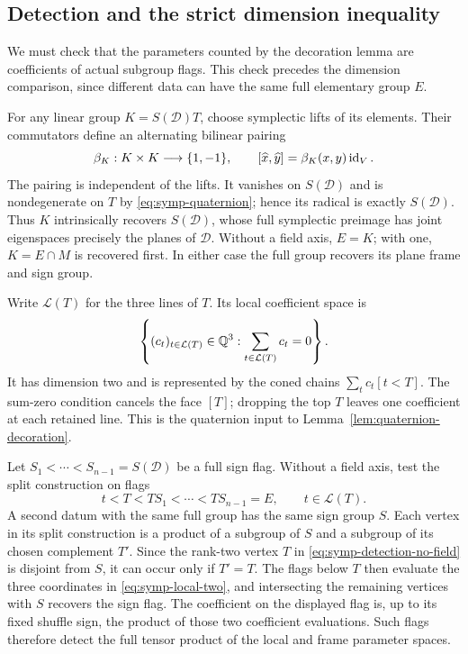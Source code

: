 \subsection{Detection and the strict dimension inequality}

We must check that the parameters counted by the decoration lemma
are coefficients of actual subgroup flags.  This check precedes
the dimension comparison, since different data can have the same
full elementary group $E$.

For any linear group $K=S(\mathcal D)T$, choose symplectic lifts of
its elements.  Their commutators define an alternating bilinear
pairing
\[
\beta_K:K\times K\longrightarrow\{1,-1\},
\qquad [\widehat x,\widehat y]=\beta_K(x,y)\operatorname{id}_V.
\]
The pairing is independent of the lifts.  It vanishes on
$S(\mathcal D)$ and is nondegenerate on $T$ by
\eqref{eq:symp-quaternion}; hence its radical is exactly
$S(\mathcal D)$.  Thus $K$ intrinsically recovers $S(\mathcal D)$,
whose full symplectic preimage has joint eigenspaces precisely the
planes of $\mathcal D$.  Without a field axis, $E=K$; with one,
$K=E\cap M$ is recovered first.  In either case the full group
recovers its plane frame and sign group.

Write $\mathcal L(T)$ for the three lines of $T$.  Its local
coefficient space is
\begin{equation}\label{eq:symp-local-two}
\left\{(c_t)_{t\in\mathcal L(T)}\in\mathbb Q^3:
                     \sum_{t\in\mathcal L(T)}c_t=0\right\}.
\end{equation}
It has dimension two and is represented by the coned chains
$\sum_t c_t[t<T]$.  The sum-zero condition cancels the face $[T]$;
dropping the top $T$ leaves one coefficient at each retained line.
This is the quaternion input to Lemma~\ref{lem:quaternion-decoration}.

Let $S_1<\cdots<S_{n-1}=S(\mathcal D)$ be a full sign flag.
Without a field axis, test the split construction on flags
\begin{equation}\label{eq:symp-detection-no-field}
t<T<TS_1<\cdots<TS_{n-1}=E,
\qquad t\in\mathcal L(T).
\end{equation}
A second datum with the same full group has the same sign group
$S$.  Each vertex in its split construction is a product of a
subgroup of $S$ and a subgroup of its chosen complement $T'$.
Since the rank-two vertex $T$ in
\eqref{eq:symp-detection-no-field} is disjoint from $S$, it can
occur only if $T'=T$.  The flags below $T$ then evaluate the three
coordinates in \eqref{eq:symp-local-two}, and intersecting the
remaining vertices with $S$ recovers the sign flag.  The coefficient
on the displayed flag is, up to its fixed shuffle sign, the product
of those two coefficient evaluations.  Such flags therefore detect
the full tensor product of the local and frame parameter spaces.

